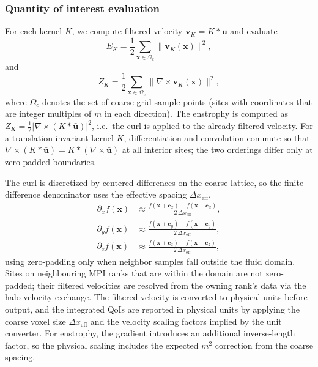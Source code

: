 \documentclass[]{elsarticle}
\begin{document}
\subsubsection{Quantity of interest evaluation}
\label{sec:qoi-3d}
For each kernel $K$, we compute filtered velocity $\boldsymbol{v}_K = K*\bar{\boldsymbol{u}}$ and evaluate
\begin{equation}
    E_K = \frac{1}{2}\sum_{\boldsymbol{x}\in\Omega_c}\|\boldsymbol{v}_K(\boldsymbol{x})\|^2,
\end{equation}
and
\begin{equation}
    Z_K = \frac{1}{2}\sum_{\boldsymbol{x}\in\Omega_c}\|\nabla\times\boldsymbol{v}_K(\boldsymbol{x})\|^2,
\end{equation}
where $\Omega_c$ denotes the set of coarse-grid sample points (sites with coordinates that are integer multiples of $m$ in each direction). The enstrophy is computed as $Z_K = \tfrac{1}{2}|\nabla\times(K*\bar{\boldsymbol{u}})|^2$, i.e.\ the curl is applied to the already-filtered velocity. For a translation-invariant kernel $K$, differentiation and convolution commute so that $\nabla\times(K*\bar{\boldsymbol{u}}) = K*(\nabla\times\bar{\boldsymbol{u}})$ at all interior sites; the two orderings differ only at zero-padded boundaries.

The curl is discretized by centered differences on the coarse lattice, so the finite-difference denominator uses the effective spacing $\Delta x_{\mathrm{eff}}$,
\begin{align}
    \partial_x f(\boldsymbol{x}) &\approx \frac{f(\boldsymbol{x}+\boldsymbol{e}_x)-f(\boldsymbol{x}-\boldsymbol{e}_x)}{2\,\Delta x_{\mathrm{eff}}},\\
    \partial_y f(\boldsymbol{x}) &\approx \frac{f(\boldsymbol{x}+\boldsymbol{e}_y)-f(\boldsymbol{x}-\boldsymbol{e}_y)}{2\,\Delta x_{\mathrm{eff}}},\\
    \partial_z f(\boldsymbol{x}) &\approx \frac{f(\boldsymbol{x}+\boldsymbol{e}_z)-f(\boldsymbol{x}-\boldsymbol{e}_z)}{2\,\Delta x_{\mathrm{eff}}},
\end{align}
using zero-padding only when neighbor samples fall outside the fluid domain. Sites on neighbouring MPI ranks that are within the domain are not zero-padded; their filtered velocities are resolved from the owning rank's data via the halo velocity exchange. The filtered velocity is converted to physical units before output, and the integrated QoIs are reported in physical units by applying the coarse voxel size $\Delta x_{\mathrm{eff}}$ and the velocity scaling factors implied by the unit converter. For enstrophy, the gradient introduces an additional inverse-length factor, so the physical scaling includes the expected $m^2$ correction from the coarse spacing.
\end{document}
